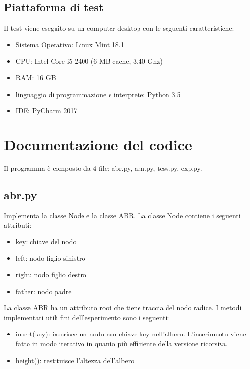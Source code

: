 \documentclass[]{article}
\begin{document}
\subsection*{Piattaforma di test}
Il test viene eseguito su un computer desktop con le seguenti caratteristiche:
\begin{itemize}
\item Sistema Operativo: Linux Mint 18.1
\item CPU: Intel Core i5-2400 (6 MB cache, 3.40 Ghz)
\item RAM: 16 GB
\item linguaggio di programmazione e interprete: Python 3.5
\item IDE: PyCharm 2017
\end{itemize}

\section{Documentazione del codice}
Il programma è composto da 4 file: abr.py, arn.py, test.py, exp.py.

\subsection*{abr.py}
Implementa la classe Node e la classe ABR.
La classe Node contiene i seguenti attributi:
\begin{itemize}
\item key: chiave del nodo
\item left: nodo figlio sinistro
\item right: nodo figlio destro
\item father: nodo padre
\end{itemize}
La classe ABR ha un attributo root che tiene traccia del nodo radice. I metodi implementati utili fini dell'esperimento sono i seguenti:
\begin{itemize}
\item insert(key): inserisce un nodo con chiave key nell'albero. L'inserimento viene fatto in modo iterativo in quanto più efficiente della versione ricorsiva.
\item height(): restituisce l'altezza dell'albero
\end{itemize}
\end{document}
